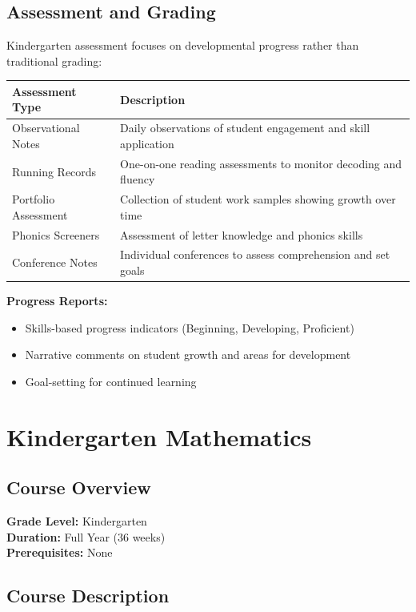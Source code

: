 \documentclass[11pt,letterpaper]{report}
\begin{document}
\section{Assessment and Grading}

Kindergarten assessment focuses on developmental progress rather than traditional grading:

\begin{center}
\begin{tabular}{|l|p{8cm}|}
\hline
\textbf{Assessment Type} & \textbf{Description} \\
\hline
Observational Notes & Daily observations of student engagement and skill application \\
\hline
Running Records & One-on-one reading assessments to monitor decoding and fluency \\
\hline
Portfolio Assessment & Collection of student work samples showing growth over time \\
\hline
Phonics Screeners & Assessment of letter knowledge and phonics skills \\
\hline
Conference Notes & Individual conferences to assess comprehension and set goals \\
\hline
\end{tabular}
\end{center}

\textbf{Progress Reports:}
\begin{itemize}
    \item Skills-based progress indicators (Beginning, Developing, Proficient)
    \item Narrative comments on student growth and areas for development
    \item Goal-setting for continued learning
\end{itemize}

\chapter{Kindergarten Mathematics}

\section{Course Overview}

\textbf{Grade Level:} Kindergarten\\
\textbf{Duration:} Full Year (36 weeks)\\
\textbf{Prerequisites:} None

\section{Course Description}
\end{document}

